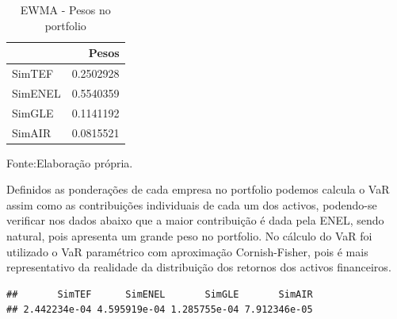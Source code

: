 \documentclass[
  12pt,
  a4paper,
  openany]{book}
\newenvironment{Shaded}{\begin{snugshade}}{\end{snugshade}}
\newcommand{\CommentTok}[1]{\textcolor[rgb]{0.56,0.35,0.01}{\textit{#1}}}
\newcommand{\DataTypeTok}[1]{\textcolor[rgb]{0.13,0.29,0.53}{#1}}
\newcommand{\DecValTok}[1]{\textcolor[rgb]{0.00,0.00,0.81}{#1}}
\newcommand{\FloatTok}[1]{\textcolor[rgb]{0.00,0.00,0.81}{#1}}
\newcommand{\KeywordTok}[1]{\textcolor[rgb]{0.13,0.29,0.53}{\textbf{#1}}}
\newcommand{\NormalTok}[1]{#1}
\newcommand{\OperatorTok}[1]{\textcolor[rgb]{0.81,0.36,0.00}{\textbf{#1}}}
\newcommand{\StringTok}[1]{\textcolor[rgb]{0.31,0.60,0.02}{#1}}
\begin{document}
\begin{table}[!h]

\caption{\label{tab:pewma}EWMA - Pesos no portfolio}
\centering
\begin{tabular}[t]{lr}
\toprule
  & Pesos\\
\midrule
SimTEF & 0.2502928\\
SimENEL & 0.5540359\\
SimGLE & 0.1141192\\
SimAIR & 0.0815521\\
\bottomrule
\end{tabular}
\end{table}
\FloatBarrier
\centering

Fonte:Elaboração própria.

\justifying
\bigskip

Definidos as ponderações de cada empresa no portfolio podemos calcula o VaR assim como as contribuições individuais de cada um dos activos, podendo-se verificar nos dados abaixo que a maior contribuição é dada pela ENEL, sendo natural, pois apresenta um grande peso no portfolio. No cálculo do VaR foi utilizado o VaR paramétrico com aproximação Cornish-Fisher, pois é mais representativo da realidade da distribuição dos retornos dos activos financeiros.

\scriptsize

\begin{Shaded}
\end{Shaded}

\begin{verbatim}
##       SimTEF      SimENEL       SimGLE       SimAIR 
## 2.442234e-04 4.595919e-04 1.285755e-04 7.912346e-05
\end{verbatim}
\end{document}
